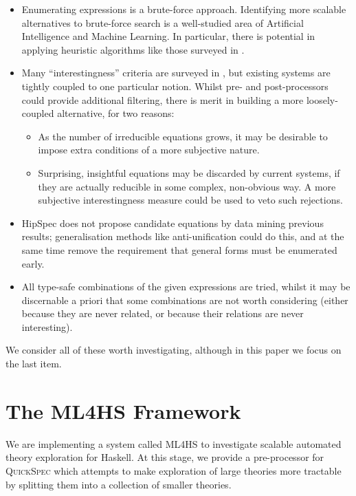 \documentclass{eceasst}
\begin{document}
\begin{itemize}
\item
  Enumerating expressions is a brute-force approach. Identifying more scalable
  alternatives to brute-force search is a well-studied area of Artificial
  Intelligence and Machine Learning. In particular, there is potential in
  applying heuristic algorithms like those surveyed in \cite{blum2011hybrid}.
\item
  Many ``interestingness'' criteria are surveyed in
  \cite{geng2006interestingness}, but existing systems are tightly coupled to
  one particular notion. Whilst pre- and post-processors could provide
  additional filtering, there is merit in building a more loosely-coupled
  alternative, for two reasons:

  \begin{itemize}
  \item
    As the number of irreducible equations grows, it may be desirable to
    impose extra conditions of a more subjective nature.
  \item
    Surprising, insightful equations may be discarded by current systems, if
    they are actually reducible in some complex, non-obvious way. A more
    subjective interestingness measure could be used to veto such
    rejections.
  \end{itemize}
\item
  HipSpec does not propose candidate equations by data mining
  previous results; generalisation methods like anti-unification could
  do this, and at the same time remove the requirement that general
  forms must be enumerated early.
\item
  All type-safe combinations of the given expressions are tried, whilst
  it may be discernable a priori that some combinations are not worth
  considering (either because they are never related, or because their
  relations are never interesting).
\end{itemize}

We consider all of these worth investigating, although in this paper we
focus on the last item.

\section{The \textsc{ML4HS} Framework}

We are implementing a system called \textsc{ML4HS} to investigate scalable
automated theory exploration for Haskell. At this stage, we provide a
pre-processor for \textsc{QuickSpec} which attempts to make exploration of large
theories more tractable by splitting them into a collection of smaller theories.
\end{document}
